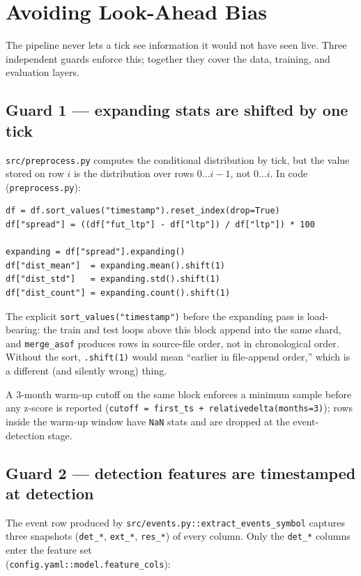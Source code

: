 \documentclass[11pt,a4paper]{article}
\begin{document}
\newpage

\section{Avoiding Look-Ahead Bias}

The pipeline never lets a tick see information it would not have seen live. Three independent guards enforce this; together they cover the data, training, and evaluation layers.

\subsection{Guard 1 --- expanding stats are shifted by one tick}
\texttt{src/preprocess.py} computes the conditional distribution by tick, but the value stored on row $i$ is the distribution over rows $0 \ldots i-1$, not $0 \ldots i$. In code (\texttt{preprocess.py}):

\begin{lstlisting}[style=pystyle]
df = df.sort_values("timestamp").reset_index(drop=True)
df["spread"] = ((df["fut_ltp"] - df["ltp"]) / df["ltp"]) * 100

expanding = df["spread"].expanding()
df["dist_mean"]  = expanding.mean().shift(1)
df["dist_std"]   = expanding.std().shift(1)
df["dist_count"] = expanding.count().shift(1)
\end{lstlisting}

The explicit \texttt{sort\_values("timestamp")} before the expanding pass is load-bearing: the train and test loops above this block append into the same shard, and \texttt{merge\_asof} produces rows in source-file order, not in chronological order. Without the sort, \texttt{.shift(1)} would mean ``earlier in file-append order,'' which is a different (and silently wrong) thing.

A 3-month warm-up cutoff on the same block enforces a minimum sample before any z-score is reported (\texttt{cutoff = first\_ts + relativedelta(months=3)}); rows inside the warm-up window have \texttt{NaN} stats and are dropped at the event-detection stage.

\subsection{Guard 2 --- detection features are timestamped at detection}
The event row produced by \texttt{src/events.py::extract\_events\_symbol} captures three snapshots (\texttt{det\_*}, \texttt{ext\_*}, \texttt{res\_*}) of every column. Only the \texttt{det\_*} columns enter the feature set 
\\
(\texttt{config.yaml::model.feature\_cols}):
\end{document}
